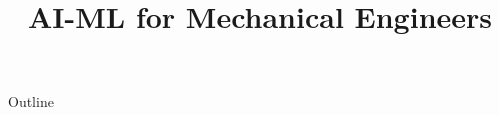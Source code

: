 \documentclass[xcolor=dvipsnames,compress,t,pdf,9pt]{beamer}
\title[\insertframenumber /\inserttotalframenumber]{AI-ML for Mechanical Engineers}
\begin{document}
	\begin{frame}
	\titlepage
	\end{frame}

	\begin{frame}{Outline}
	    \tableofcontents
	\end{frame}

	
\end{document}
